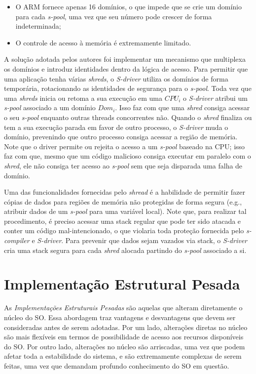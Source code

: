 \begin{itemize}
  \item O ARM fornece apenas 16 domínios, o que impede que se crie um domínio
        para cada \emph{s-pool}, uma vez que seu número pode crescer de forma
        indeterminada;
  \item O controle de acesso à memória é extremamente limitado.
\end{itemize}

A solução adotada pelos autores foi implementar um mecanismo que multiplexa os
domínios e introduz identidades dentro da lógica de acesso. Para permitir que
uma aplicação tenha várias \emph{shreds}, o \emph{S-driver} utiliza os domínios
de forma temporária, rotacionando as identidades de segurança para o
\emph{s-pool}. Toda vez que uma \emph{shreds} inicia ou retoma a sua execução
em uma $CPU_i$ o \emph{S-driver} atribui um \emph{s-pool} associado a um
domínio $Dom_i$. Isso faz com que uma \emph{shred} consiga acessar o seu
\emph{s-pool} enquanto outras threads concorrentes não. Quando o
\emph{shred} finaliza ou tem a sua execução parada em favor de outro
processo, o \emph{S-driver} muda o domínio, prevenindo que outro processo
consiga acessar a região de memória. Note que o driver permite ou rejeita o
acesso a um \emph{s-pool} baseado na CPU; isso faz com que, mesmo que um código
malicioso consiga executar em paralelo com o \emph{shred}, ele não consiga ter
acesso ao \emph{s-pool} sem que seja disparada uma falha de domínio.

Uma das funcionalidades fornecidas pelo \emph{shread} é a habilidade de
permitir fazer cópias de dados para regiões de memória não protegidas de forma segura
(e.g., atribuir dados de um \emph{s-pool} para uma variável local). Note que,
para realizar tal procedimento, é preciso acessar uma stack regular que pode ter
sido atacada e conter um código mal-intencionado, o que violaria toda proteção
fornecida pelo \emph{s-compiler} e \emph{S-driver}. Para prevenir que dados
sejam vazados via stack, o \emph{S-driver} cria uma stack segura para cada
\emph{shred} alocada partindo do \emph{s-pool} associado a si.

\section{Implementação Estrutural Pesada}

As \textit{Implementações Estruturais Pesadas} são aquelas que alteram
diretamente o núcleo do SO. Essa abordagem traz vantagens e desvantagens que
devem ser consideradas antes de serem adotadas. Por um lado, alterações diretas
no núcleo são mais flexíveis em termos de possibilidade de acesso aos recursos
disponíveis do SO. Por outro lado, alterações no núcleo são arriscadas, uma vez
que podem afetar toda a estabilidade do sistema, e são extremamente complexas de
serem feitas, uma vez que demandam profundo conhecimento do SO em questão.

